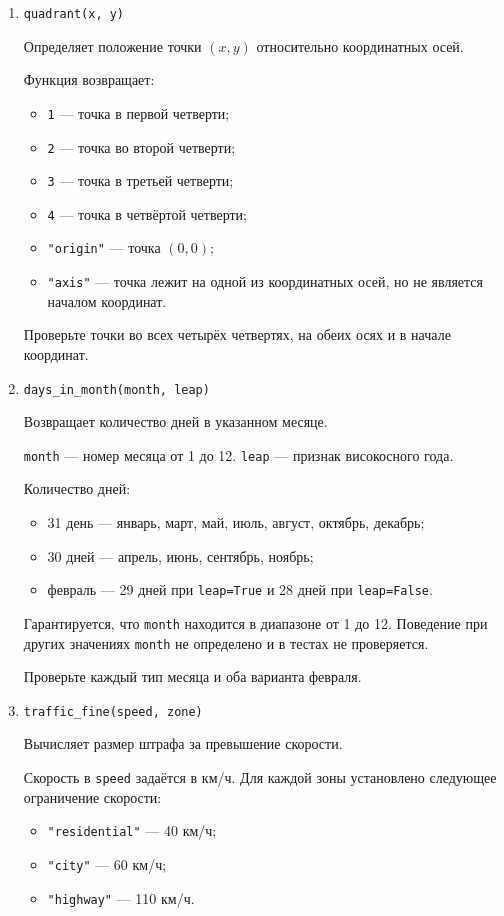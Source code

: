 \begin{enumerate}
\item \texttt{quadrant(x, y)}

Определяет положение точки $(x,y)$ относительно координатных осей.

Функция возвращает:
\begin{itemize}
    \item \texttt{1} --- точка в первой четверти;
    \item \texttt{2} --- точка во второй четверти;
    \item \texttt{3} --- точка в третьей четверти;
    \item \texttt{4} --- точка в четвёртой четверти;
    \item \texttt{"origin"} --- точка $(0,0)$;
    \item \texttt{"axis"} --- точка лежит на одной из координатных осей,
    но не является началом координат.
\end{itemize}

Проверьте точки во всех четырёх четвертях, на обеих осях и в начале
координат.

\item \texttt{days\_in\_month(month, leap)}

Возвращает количество дней в указанном месяце.

\texttt{month} --- номер месяца от 1 до 12.
\texttt{leap} --- признак високосного года.

Количество дней:
\begin{itemize}
    \item 31 день --- январь, март, май, июль, август, октябрь, декабрь;
    \item 30 дней --- апрель, июнь, сентябрь, ноябрь;
    \item февраль --- 29 дней при \texttt{leap=True} и 28 дней при
    \texttt{leap=False}.
\end{itemize}

Гарантируется, что \texttt{month} находится в диапазоне от 1 до 12.
Поведение при других значениях \texttt{month} не определено и в тестах
не проверяется.

Проверьте каждый тип месяца и оба варианта февраля.

\item \texttt{traffic\_fine(speed, zone)}

Вычисляет размер штрафа за превышение скорости.

Скорость в \texttt{speed} задаётся в км/ч.
Для каждой зоны установлено следующее ограничение скорости:
\begin{itemize}
    \item \texttt{"residential"} --- 40 км/ч;
    \item \texttt{"city"} --- 60 км/ч;
    \item \texttt{"highway"} --- 110 км/ч.
\end{itemize}


\end{enumerate}
